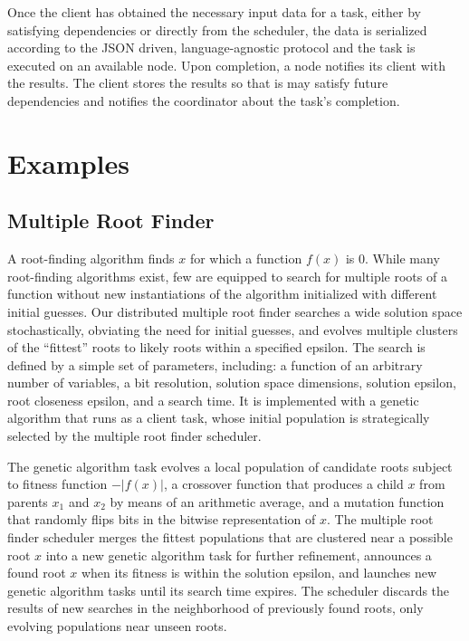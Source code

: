 \documentclass [11pt, twocolumn] {article}
\begin{document}
Once the client has obtained the necessary input data for a task, either by satisfying dependencies or directly from the scheduler, the data is serialized according to the JSON driven, language-agnostic protocol and the task is executed on an available node. Upon completion, a node notifies its client with the results. The client stores the results so that is may satisfy future dependencies and notifies the coordinator about the task's completion.

\section {Examples}

\subsection {Multiple Root Finder} 

\newcommand{\abs}[1]{\lvert{#1}\rvert}

A root-finding algorithm finds $x$ for which a function $f(x)$ is 0. While many root-finding algorithms exist, few are equipped to search for multiple roots of a function without new instantiations of the algorithm initialized with different initial guesses. Our distributed multiple root finder searches a wide solution space stochastically, obviating the need for initial guesses, and evolves multiple clusters of the ``fittest'' roots to likely roots within a specified epsilon. The search is defined by a simple set of parameters, including: a function of an arbitrary number of variables, a bit resolution, solution space dimensions, solution epsilon, root closeness epsilon, and a search time. It is implemented with a genetic algorithm that runs as a client task, whose initial population is strategically selected by the multiple root finder scheduler.

The genetic algorithm task evolves a local population of candidate roots subject to fitness function $-\abs{f(x)}$, a crossover function that produces a child $x$ from parents $x_1$ and $x_2$ by means of an arithmetic average, and a mutation function that randomly flips bits in the bitwise representation of $x$. The multiple root finder scheduler merges the fittest populations that are clustered near a possible root $x$ into a new genetic algorithm task for further refinement, announces a found root $x$ when its fitness is within the solution epsilon, and launches new genetic algorithm tasks until its search time expires. The scheduler discards the results of new searches in the neighborhood of previously found roots, only evolving populations near unseen roots.
\end{document}
